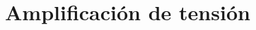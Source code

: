 \documentclass[10pt,a4paper]{article}
\begin{document}
		\section{Amplificación de tensión}
			
						
%			
%		
%			
%		
%			
%	
%			
%	
%			
%	
%			
%		
%			
%	
%			
%			
%			
	\pagebreak
\end{document}
